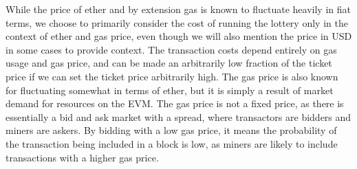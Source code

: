 While the price of ether and by extension gas is known to fluctuate heavily in fiat terms, we choose to primarily consider the cost of running the lottery only in the context of ether and gas price, even though we will also mention the price in USD in some cases to provide context. The transaction costs depend entirely on gas usage and gas price, and can be made an arbitrarily low fraction of the ticket price if we can set the ticket price arbitrarily high. The gas price is also known for fluctuating somewhat in terms of ether, but it is simply a result of market demand for resources on the EVM. The gas price is not a fixed price, as there is essentially a bid and ask market with a spread, where transactors are bidders and miners are askers. By bidding with a low gas price, it means the probability of the transaction being included in a block is low, as miners are likely to include transactions with a higher gas price.
